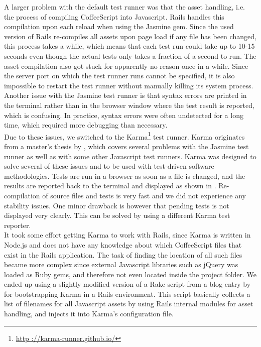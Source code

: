 A larger problem with the default test runner was that the asset
handling, i.e. the process of compiling CoffeeScript into Javascript.
Rails handles this compilation upon each reload when using the Jasmine
gem. Since the used version of Rails re-compiles all assets upon page
load if any file has been changed, this process takes a while, which
means that each test run could take up to 10-15 seconds even though the
actual tests only takes a fraction of a second to run. The asset
compilation also got stuck for apparently no reason once in a while.
Since the server port on which the test runner runs cannot be specified,
it is also impossible to restart the test runner without manually
killing its system process.\\

Another issue with the Jasmine test runner is that syntax errors are
printed in the terminal rather than in the browser window where the test
result is reported, which is confusing. In practice, syntax errors were
often undetected for a long time, which required more debugging than
necessary.\\

Due to these issues, we switched to the Karma\footnote{\url{http
://karma-runner.github.io/}} test runner. Karma originates from a
master's thesis by \citet{article:karma}, which covers several problems
with the Jasmine test runner as well as with some other Javascript test
runners. Karma was designed to solve several of these issues and to be
used with test-driven software methodologies. Tests are run in a browser
as soon as a file is changed, and the results are reported back to the
terminal and displayed as shown in . Re-
compilation of source files and tests is very fast and we did not
experience any stability issues. One minor drawback is however that
pending tests is not displayed very clearly. This can be solved by using
a different Karma test reporter.\\

It took some effort getting Karma to work with Rails, since Karma is
written in Node.js and does not have any knowledge about which
CoffeeScript files that exist in the Rails application. The task of
finding the location of all such files became more complex since
external Javascript libraries such as jQuery was loaded as Ruby gems,
and therefore not even located inside the project folder. We ended up
using a slightly modified version of a Rake script from a blog entry by
\citet{web:saunier_angular} for bootstrapping Karma in a Rails
environment. This script basically collects a list of filenames for all
Javascript assets by using Rails internal modules for asset handling,
and injects it into Karma's configuration file.\\

